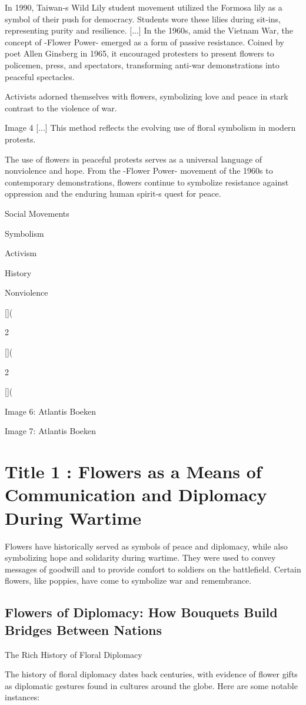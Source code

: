 \documentclass[12pt]{article}
\begin{document}
In 1990, Taiwan-s Wild Lily student movement utilized the Formosa lily as a symbol of their push for democracy. Students wore these lilies during sit-ins, representing purity and resilience. [...] In the 1960s, amid the Vietnam War, the concept of -Flower Power- emerged as a form of passive resistance. Coined by poet Allen Ginsberg in 1965, it encouraged protesters to present flowers to policemen, press, and spectators, transforming anti-war demonstrations into peaceful spectacles.

Activists adorned themselves with flowers, symbolizing love and peace in stark contrast to the violence of war.

Image 4 [...] This method reflects the evolving use of floral symbolism in modern protests.

The use of flowers in peaceful protests serves as a universal language of nonviolence and hope. From the -Flower Power- movement of the 1960s to contemporary demonstrations, flowers continue to symbolize resistance against oppression and the enduring human spirit-s quest for peace.

Social Movements

Symbolism

Activism

History

Nonviolence

[](

2

[](

2

[](

Image 6: Atlantis Boeken

Image 7: Atlantis Boeken
\section{Title 1 : Flowers as a Means of Communication and Diplomacy During Wartime}
Flowers have historically served as symbols of peace and diplomacy, while also symbolizing hope and solidarity during wartime. They were used to convey messages of goodwill and to provide comfort to soldiers on the battlefield. Certain flowers, like poppies, have come to symbolize war and remembrance.\subsection{Flowers of Diplomacy: How Bouquets Build Bridges Between Nations}
The Rich History of Floral Diplomacy

The history of floral diplomacy dates back centuries, with evidence of flower gifts as diplomatic gestures found in cultures around the globe. Here are some notable instances:
\end{document}
